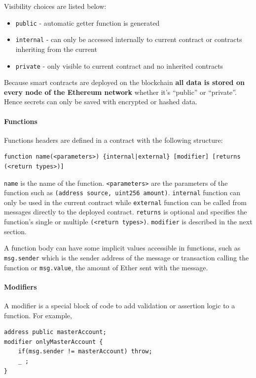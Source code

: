 \documentclass[a4paper,12pt]{article} %
\def\code#1{\texttt{#1}}
\begin{document}
Visibility choices are listed below:

\begin{itemize}
	\item \code{public} - automatic getter function is generated
	\item \code{internal} - can only be accessed internally to current contract or contracts inheriting from the current
	\item \code{private} - only visible to current contract and no inherited contracts
\end{itemize}

Because smart contracts are deployed on the blockchain \textbf{all data is stored on every node of the Ethereum network} whether it's ``public'' or ``private''. Hence secrets can only be saved with encrypted or hashed data.

\paragraph*{Functions}

Functions headers are defined in a contract with the following structure:
\lstset{basicstyle=\scriptsize}
\begin{lstlisting}
function name(<parameters>) {internal|external} [modifier] [returns (<return types>)]
\end{lstlisting}

\code{name} is the name of the function. \code{<parameters>} are the parameters of the function such as \code{(address source, uint256 amount)}. \code{internal} function can only be used in the current contract while \code{external} function can be called from messages directly to the deployed contract. \code{returns} is optional and specifies the function's single or multiple \code{(<return types>)}. \code{modifier} is described in the next section.

A function body can have some implicit values accessible in functions, such as \code{msg.sender} which is the sender address of the message or transaction calling the function or \code{msg.value}, the amount of Ether sent with the message.

\paragraph*{Modifiers}

A modifier is a special block of code to add validation or assertion logic to a function. For example,

\lstset{basicstyle=\small}
\begin{lstlisting}
address public masterAccount;
modifier onlyMasterAccount {
    if(msg.sender != masterAccount) throw;
    _ ;
}
\end{lstlisting}
\end{document}
